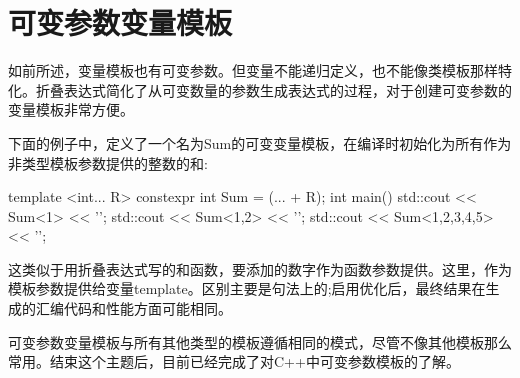 \section{可变参数变量模板}
如前所述，变量模板也有可变参数。但变量不能递归定义，也不能像类模板那样特化。折叠表达式简化了从可变数量的参数生成表达式的过程，对于创建可变参数的变量模板非常方便。

下面的例子中，定义了一个名为Sum的可变变量模板，在编译时初始化为所有作为非类型模板参数提供的整数的和:

\begin{cpp}
template <int... R>
constexpr int Sum = (... + R);
int main()
{
	std::cout << Sum<1> << '\n';
	std::cout << Sum<1,2> << '\n';
	std::cout << Sum<1,2,3,4,5> << '\n';
}
\end{cpp}

这类似于用折叠表达式写的和函数，要添加的数字作为函数参数提供。这里，作为模板参数提供给变量template。区别主要是句法上的;启用优化后，最终结果在生成的汇编代码和性能方面可能相同。

可变参数变量模板与所有其他类型的模板遵循相同的模式，尽管不像其他模板那么常用。结束这个主题后，目前已经完成了对C++中可变参数模板的了解。















































